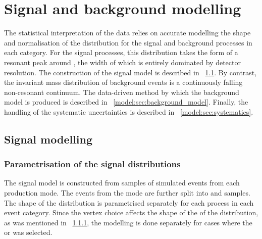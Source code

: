\chapter{Signal and background modelling}
\label{chap:model}

The statistical interpretation of the data relies on accurate modelling the shape and normalisation of the \mgg distribution for the signal and background processes in each category. %
For the signal processes, this distribution takes the form of a resonant peak around \mH, the width of which is entirely dominated by detector resolution. The construction of the signal model is described in \Sec~\ref{model:sec:signal_model}. By contrast, the invariant mass distribution of background events is a continuously falling non-resonant continuum. The data-driven method by which the background model is produced is described in \Sec~\ref{model:sec:background_model}. Finally, the handling of the systematic uncertainties is described in \Sec~\ref{model:sec:systematics}. 

\section{Signal modelling}
\label{model:sec:signal_model}

\subsection{Parametrisation of the signal \mgg distributions}

The signal model is constructed from samples of simulated \Hgg events from each production mode. The events from the \VH mode are further split into \WH and \ZH samples. %
The shape of the \mgg distribution is parametrised separately for each process in each event category. Since the vertex choice affects the shape of the \mgg  of the distribution, as was mentioned in \Sec~\ref{}, the modelling is done separately for cases where the \RV or \WV  was selected. 

